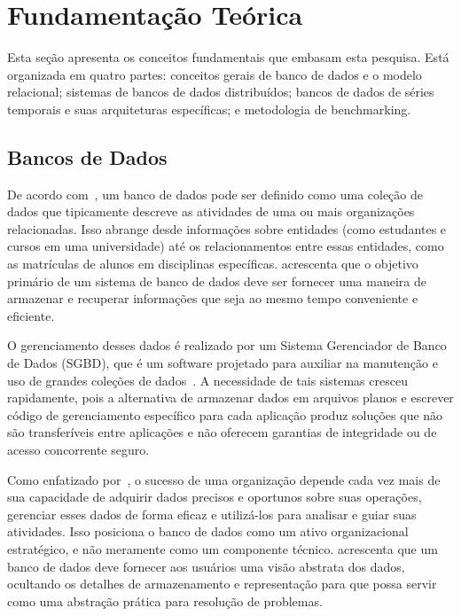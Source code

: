 \section{Fundamentação Teórica}
\label{sec:theoretical}

Esta seção apresenta os conceitos fundamentais que embasam esta pesquisa. Está organizada em
quatro partes: conceitos gerais de banco de dados e o modelo relacional; sistemas de bancos de
dados distribuídos; bancos de dados de séries temporais e suas arquiteturas específicas; e
metodologia de benchmarking.

\subsection{Bancos de Dados}

De acordo com~\cite{Ramakrishnan2003}, um banco de dados pode ser definido como uma coleção de
dados que tipicamente descreve as atividades de uma ou mais organizações relacionadas.
Isso abrange desde informações sobre entidades (como estudantes e cursos em uma universidade)
até os relacionamentos entre essas entidades, como as matrículas de alunos em disciplinas
específicas. \cite{Silberschatz2020} acrescenta que o objetivo primário de um sistema de banco de
dados deve ser fornecer uma maneira de armazenar e recuperar informações que seja ao mesmo tempo
conveniente e eficiente.

O gerenciamento desses dados é realizado por um Sistema Gerenciador de Banco de Dados (SGBD),
que é um software projetado para auxiliar na manutenção e uso de grandes coleções de
dados~\citep{Ramakrishnan2003}. A necessidade de tais sistemas cresceu rapidamente, pois a
alternativa de armazenar dados em arquivos planos e escrever código de gerenciamento específico
para cada aplicação produz soluções que não são transferíveis entre aplicações e não oferecem
garantias de integridade ou de acesso concorrente seguro.

Como enfatizado por~\cite{Ramakrishnan2003}, o sucesso de uma organização depende cada vez mais
de sua capacidade de adquirir dados precisos e oportunos sobre suas operações, gerenciar esses
dados de forma eficaz e utilizá-los para analisar e guiar suas atividades. Isso posiciona o banco
de dados como um ativo organizacional estratégico, e não meramente como um componente técnico.
\cite{Silberschatz2020} acrescenta que um banco de dados deve fornecer aos usuários uma visão
abstrata dos dados, ocultando os detalhes de armazenamento e representação para que possa servir
como uma abstração prática para resolução de problemas.

